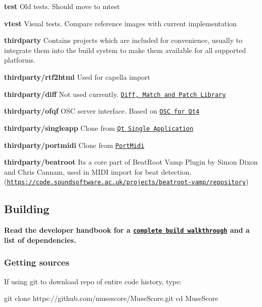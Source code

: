 \begin{DoxyItemize}
\item {\bfseries test} Old tests. Should move to mtest
\item {\bfseries vtest} Visual tests. Compare reference images with current implementation
\item {\bfseries thirdparty} Contains projects which are included for convenience, usually to integrate them into the build system to make them available for all supported platforms.
\begin{DoxyItemize}
\item {\bfseries thirdparty/rtf2html} Used for capella import
\item {\bfseries thirdparty/diff} Not used currently. \href{https://code.google.com/p/google-diff-match-patch/}{\tt Diff, Match and Patch Library}
\item {\bfseries thirdparty/ofqf} O\+SC server interface. Based on \href{http://www.arnoldarts.de/projects/ofqf/}{\tt O\+SC for Qt4}
\item {\bfseries thirdparty/singleapp} Clone from \href{https://github.com/qtproject/qt-solutions/tree/master/qtsingleapplication}{\tt Qt Single Application}
\item {\bfseries thirdparty/portmidi} Clone from \href{https://sourceforge.net/projects/portmedia/}{\tt Port\+Midi}
\item {\bfseries thirdparty/beatroot} It\textquotesingle{}s a core part of Beat\+Root Vamp Plugin by Simon Dixon and Chris Cannam, used in M\+I\+DI import for beat detection. (\href{https://code.soundsoftware.ac.uk/projects/beatroot-vamp/repository}{\tt https\+://code.\+soundsoftware.\+ac.\+uk/projects/beatroot-\/vamp/repository})
\end{DoxyItemize}
\end{DoxyItemize}

\subsection*{Building}

{\bfseries Read the developer handbook for a \href{https://musescore.org/en/developers-handbook/compilation}{\tt complete build walkthrough} and a list of dependencies.}

\subsubsection*{Getting sources}

If using git to download repo of entire code history, type\+: \begin{DoxyVerb}git clone https://github.com/musescore/MuseScore.git
cd MuseScore
\end{DoxyVerb}


